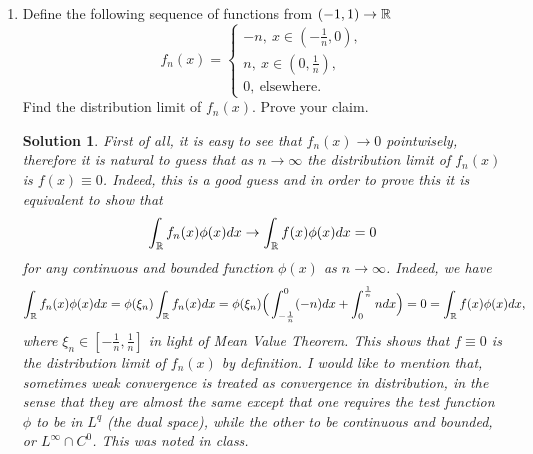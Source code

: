 \documentclass[6pt]{article}
\newtheorem{solution}{Solution}
\numberwithin{equation}{section}
\def\mathbb{\Bbb}
\begin{document}
\begin{enumerate}
\item  Define the following sequence of functions from $(-1,1)\rightarrow \mathbb{R}$
\begin{equation}f_n(x)=
\left\{
\begin{array}{ll}
-n,~x\in(-\frac{1}{n},0),\\
n,~x\in(0,\frac{1}{n}),\\
0,~\text{elsewhere}.
\end{array}
\right.
\end{equation}
Find the distribution limit of $f_n(x)$.  Prove your claim.
\begin{solution}
First of all, it is easy to see that $f_n(x)\rightarrow 0$ pointwisely, therefore it is natural to guess that as $n\rightarrow \infty$ the distribution limit of $f_n(x)$ is $f(x)\equiv 0$.  Indeed, this is a good guess and in order to prove this it is equivalent to show that
\[\int_{\mathbb{R}}f_n (x)\phi(x)dx\rightarrow \int_{\mathbb{R}}f (x)\phi(x)dx= 0\]
for any continuous and bounded function $\phi(x)$ as $n\rightarrow\infty$.  Indeed, we have
\begin{align*}
\int_{\mathbb{R}}f_n (x)\phi(x)dx=\phi(\xi_n)\int_{\mathbb{R}}f_n (x)dx=\phi(\xi_n)\Big(\int^{0}_{-\frac{1}{n}}(-n)dx+\int_{0}^{\frac{1}{n}}ndx\Big)=0=\int_{\mathbb R} f(x)\phi(x)dx,
\end{align*}
where $\xi_n\in[-\frac{1}{n},\frac{1}{n}]$ in light of Mean Value Theorem.  This shows that $f\equiv 0$ is the distribution limit of $f_n(x)$ by definition.  I would like to mention that, sometimes weak convergence is treated as convergence in distribution, in the sense that they are almost the same except that one requires the test function $\phi$ to be in $L^q$ (the dual space), while the other to be continuous and bounded, or $L^\infty \cap C^0$.  This was noted in class.
\end{solution}


\end{enumerate}
\end{document}
